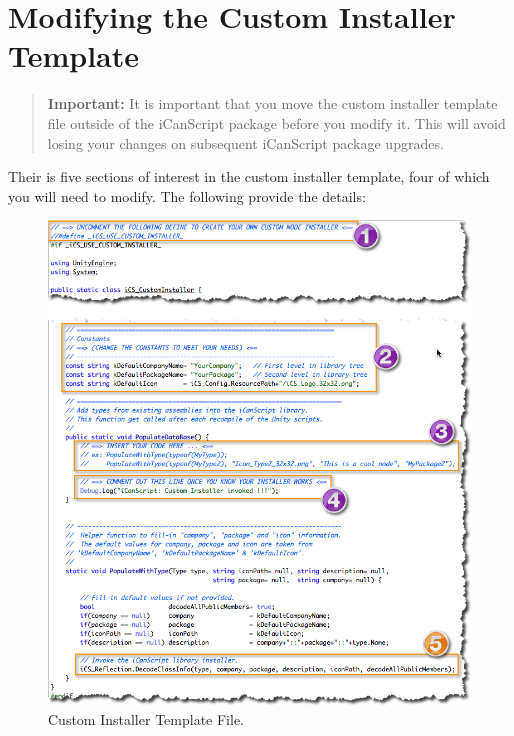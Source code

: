 \section{Modifying the Custom Installer Template}
\label{modifyingthecustominstallertemplate}

\begin{quote}

\textbf{Important:} It is important that you move the custom installer template file outside of the iCanScript package before you modify it. This will avoid losing your changes on subsequent iCanScript package upgrades.
\end{quote}

Their is five sections of interest in the custom installer template, four of which you will need to modify. The following provide the details:

\begin{figure}[htbp]
\centering
\includegraphics[keepaspectratio,width=\textwidth,height=0.75\textheight]{custom-installer-template-file.png}
\caption{Custom Installer Template File.}
\label{custom-installer-template-file.png}
\end{figure}

